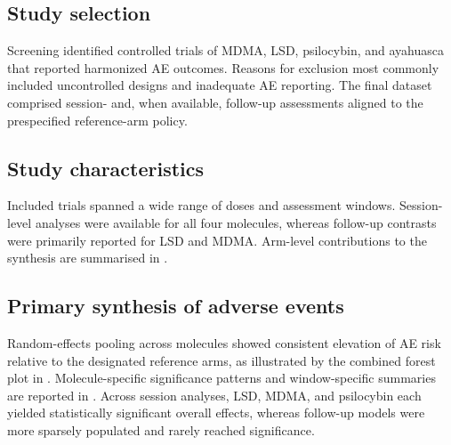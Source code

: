 \subsection{Study selection}
Screening identified controlled trials of MDMA, LSD, psilocybin, and ayahuasca that reported harmonized AE outcomes. Reasons for exclusion most commonly included uncontrolled designs and inadequate AE reporting. The final dataset comprised session- and, when available, follow-up assessments aligned to the prespecified reference-arm policy.

\subsection{Study characteristics}
Included trials spanned a wide range of doses and assessment windows. Session-level analyses were available for all four molecules, whereas follow-up contrasts were primarily reported for LSD and MDMA. Arm-level contributions to the synthesis are summarised in .

\subsection{Primary synthesis of adverse events}
Random-effects pooling across molecules showed consistent elevation of AE risk relative to the designated reference arms, as illustrated by the combined forest plot in . Molecule-specific significance patterns and window-specific summaries are reported in . Across session analyses, LSD, MDMA, and psilocybin each yielded statistically significant overall effects, whereas follow-up models were more sparsely populated and rarely reached significance.


